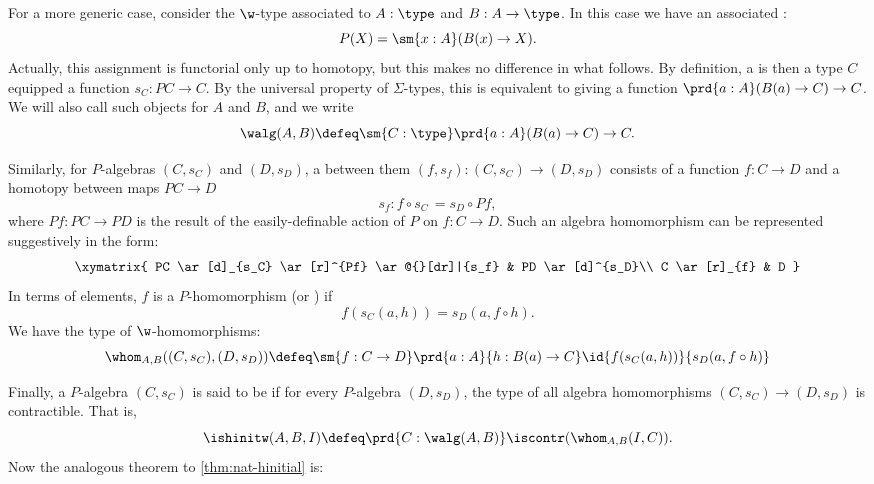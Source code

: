 %
%
%
For a more generic case, consider the $\w$-type associated to $A : \type$ and $B : A \to \type$.
In this case we have an associated :
\begin{equation}
\label{eq:polyfunc}
P(X) = \sm{x : A} (B(x) \rightarrow X).
\end{equation}
Actually, this assignment is functorial only up to homotopy, but this makes no difference in what follows.
By definition, a 
%
%
is then a type $C$ equipped a function $s_C :  PC \rightarrow C$.
By the universal property of $\Sigma$-types, this is equivalent to giving a function $\prd{a:A} (B(a) \to C) \to C$.
We will also call such objects 
%
for $A$ and $B$, and we write
\begin{equation*}
\walg(A,B) \defeq \sm {C : \type} \prd{a:A} (B(a) \to C) \to C.
\end{equation*}

Similarly, for $P$-algebras $(C,s_C)$ and $(D,s_D)$, a 
%
between them $(f, s_f) : (C, s_C) \rightarrow (D, s_D)$ consists of a function $f : C \rightarrow D$ and a homotopy between maps $PC \rightarrow D$
\[
s_f :  f \circ s_C \, = s_{D} \circ Pf,
\]
where $Pf : PC\rightarrow PD$ is the result of the easily-definable action of $P$ on $f: C \rightarrow D$. Such an algebra homomorphism can be represented suggestively in the form:
\[
\xymatrix{
 PC \ar[d]_{s_C} \ar[r]^{Pf}  \ar@{}[dr]|{s_f} &  PD \ar[d]^{s_D}\\
C \ar[r]_{f}   & D }
\]
In terms of elements, $f$ is a $P$-homomorphism (or ) if
%
%
\[f(s_C(a,h)) = s_D(a,f \circ h).\]
We have the type of $\w$-homomorphisms:
\begin{equation*}
  \whom_{A,B}((C, s_C),(D,s_D)) \defeq \sm{f : C \to D} \prd{a:A}{h:B(a)\to C} \id{f(s_C(a,h))}{s_D(a, f\circ h)}
\end{equation*}

%
Finally, a $P$-algebra $(C, s_C)$ is said to be 
%
%
if for every $P$-algebra $(D, s_D)$, the type of all algebra homomorphisms $(C, s_C) \rightarrow (D, s_D)$ is contractible.
That is,
\begin{equation*}
\ishinitw(A,B,I) \defeq \prd{C : \walg(A,B)} \iscontr(\whom_{A,B}(I,C)).
\end{equation*}
%
Now the analogous theorem to \autoref{thm:nat-hinitial} is:

